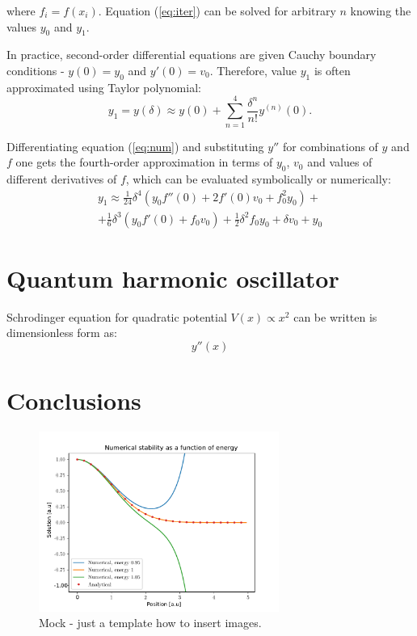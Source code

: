 \documentclass{llncs}
\begin{document}
where $f_i=f(x_i)$. Equation (\ref{eq:iter}) can be solved for arbitrary $n$ knowing the values $y_0$ and $y_1$.

In practice, second-order differential equations are given Cauchy boundary conditions - $y(0)=y_0$ and $y'(0)=v_0$. Therefore, value $y_1$ is often approximated
using Taylor polynomial:
\begin{equation}
\label{eq:taylor}
y_1=y(\delta)\approx y(0)+ \sum_{n=1}^4 \frac{\delta^n}{n!} y^{(n)}(0).
\end{equation}

Differentiating equation (\ref{eq:num}) and substituting $y''$ for combinations of $y$ and $f$ one gets the fourth-order approximation in terms of $y_0$, $v_0$ and values of different derivatives of $f$, which can be evaluated symbolically or numerically:
\begin{align}
\label{eq:approx}
	y_1 \approx \frac{1}{24} \delta ^4\left(y_0 f''(0)+2 f'(0) v_0+f_0^2 y_0\right) + \\
	+\frac{1}{6} \delta ^3 \left(y_0 f'(0) +f_0 v_0\right)+\frac{1}{2} \delta ^2 f_0
   y_0+\delta  v_0+y_0
\end{align}

\section{Quantum harmonic oscillator}
Schrodinger equation for quadratic potential $V(x)\propto x^2$ can be written is dimensionless form as:
$$y''(x)$$ 
\section{Conclusions}

\begin{figure}
\centering
\includegraphics[width=0.7\textwidth]{images/Quantum_oscillator-0}
\caption{Mock - just a template how to insert images.}
\label{fig:mock}
\end{figure}
\end{document}
